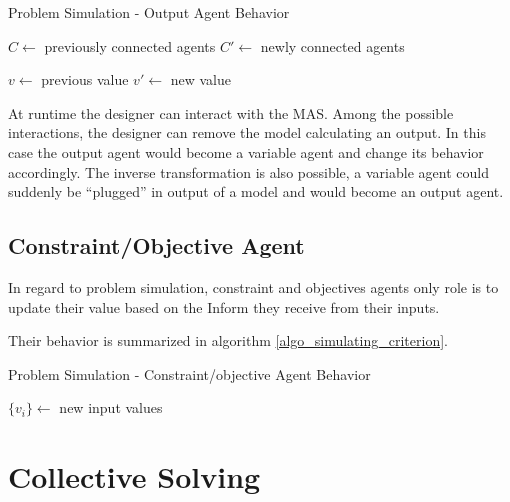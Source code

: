 \begin{algorithm}
\caption{Problem Simulation - Output Agent Behavior}
\label{algo_simulating_output}

	$C \leftarrow$ previously connected agents\;
	$C'\leftarrow$  newly connected agents\;
		
	$v \leftarrow$ previous value\;
	$v'\leftarrow$ new value\;
	
	
	
\end{algorithm}

At runtime the designer can interact with the MAS. Among the possible interactions, the designer can remove the model calculating an output. In this case the output agent would become a variable agent and change its behavior accordingly. The inverse transformation is also possible, a variable agent could suddenly be \enquote{plugged} in output of a model and would become an output agent.

\subsection{Constraint/Objective Agent}

In regard to problem simulation, constraint and objectives agents only role is to update their value based on the Inform they receive from their inputs.

Their behavior is summarized in algorithm \ref{algo_simulating_criterion}.

\begin{algorithm}
\caption{Problem Simulation - Constraint/objective Agent Behavior}
\label{algo_simulating_criterion}

	$\{v_i\} \leftarrow$ new input values\;
			

\end{algorithm}

\section{Collective Solving}\label{collective_solv}

